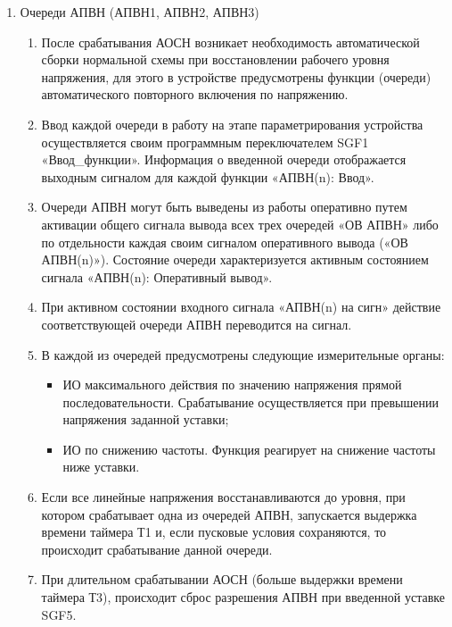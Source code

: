 \begin{enumerate}

\item Очереди АПВН (АПВН1, АПВН2, АПВН3) \label{punktapvn}

\begin{enumerate}

\item
После срабатывания АОСН возникает необходимость автоматической сборки нормальной схемы при восстановлении рабочего уровня напряжения, для этого в устройстве предусмотрены функции (очереди) автоматического повторного включения по напряжению. 

\item
Ввод каждой очереди в работу на этапе параметрирования устройства осуществляется своим программным переключателем SGF1 «Ввод\_функции». Информация о введенной очереди отображается выходным сигналом для каждой функции «АПВН(n): Ввод».

\item
Очереди АПВН могут быть выведены из работы оперативно путем активации общего сигнала вывода всех трех очередей «ОВ АПВН» либо по отдельности каждая своим сигналом оперативного вывода («ОВ АПВН(n)»). Состояние очереди характеризуется активным состоянием сигнала «АПВН(n): Оперативный вывод».

\item
При активном состоянии входного сигнала «АПВН(n) на сигн» действие соответствующей очереди АПВН переводится на сигнал.

\item
В каждой из очередей предусмотрены следующие измерительные органы:
\begin{itemize}
    \item ИО максимального действия по значению напряжения прямой последовательности. Срабатывание осуществляется при превышении напряжения заданной уставки;
    \item ИО по снижению частоты. Функция реагирует на снижение частоты ниже уставки.
\end{itemize}

\item
Если все линейные напряжения восстанавливаются до уровня, при котором срабатывает одна из очередей АПВН, запускается выдержка времени таймера Т1 и, если пусковые условия сохраняются, то происходит срабатывание данной очереди.

\item
При длительном срабатывании АОСН (больше выдержки времени таймера Т3), происходит сброс разрешения АПВН при введенной уставке SGF5.


\end{enumerate}
\end{enumerate}
